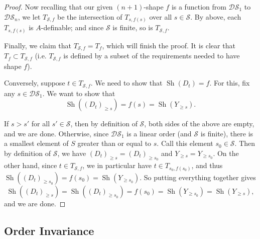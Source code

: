 \documentclass{amsart}
\theoremstyle{definition}
\begin{document}
\begin{proof}
    Now recalling that our given $(n+1)$-shape $f$ is a function from $\mathcal{DS}_1$ to $\mathcal{DS}_n$, we let $T_{\mathcal S,f}$ be the intersection of $T_{s,f(s)}$ over all $s\in\mathcal S$. By above, each $T_{s,f(s)}$ is $A$-definable; and since $\mathcal S$ is finite, so is $T_{\mathcal S,f}$.

    Finally, we claim that $T_{\mathcal S,f}=T_f$, which will finish the proof. It is clear that $T_f\subset T_{\mathcal S,f}$ (i.e. $T_{\mathcal S,f}$ is defined by a subset of the requirements needed to have shape $f$).

    Conversely, suppose $t\in T_{\mathcal S,f}$. We need to show that $\operatorname{Sh}(D_t)=f$. For this, fix any $s\in\mathcal{DS}_1$. We want to show that $$\operatorname{Sh}((D_t)_{\geq s})=f(s)=\operatorname{Sh}(Y_{\geq s}).$$

    If $s>s'$ for all $s'\in\mathcal S$, then by definition of $\mathcal S$, both sides of the above are empty, and we are done. Otherwise, since $\mathcal{DS}_1$ is a linear order (and $\mathcal S$ is finite), there is a smallest element of $S$ greater than or equal to $s$. Call this element $s_0\in\mathcal S$. Then by definition of $\mathcal S$, we have $(D_t)_{\geq s}=(D_t)_{\geq s_0}$ and $Y_{\geq s}=Y_{\geq s_0}$. On the other hand, since $t\in T_{\mathcal S,f}$, we in particular have $t\in T_{s_0,f(s_0)}$, and thus $\operatorname{Sh}((D_t)_{\geq s_0})=f(s_0)=\operatorname{Sh}(Y_{\geq s_0})$. So putting everything together gives $$\operatorname{Sh}((D_t)_{\geq s})=\operatorname{Sh}((D_t)_{\geq s_0})=f(s_0)=\operatorname{Sh}(Y_{\geq s_0})=\operatorname{Sh}(Y_{\geq s}),$$ and we are done.
\end{proof}

\subsection{Order Invariance}
\end{document}
